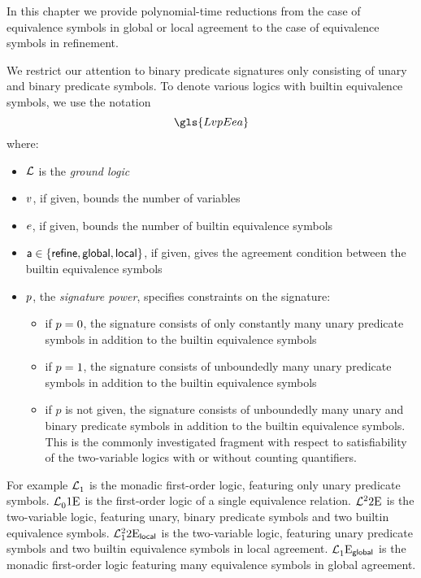 In this chapter we provide polynomial-time reductions from the case of
equivalence symbols in global or local agreement to the case of equivalence
symbols in refinement.

We restrict our attention to binary predicate signatures only consisting of
unary and binary predicate symbols.
To denote various logics with builtin equivalence symbols, we use the notation
\[
  \gls{LvpEea}
\]
where:
\begin{itemize}
  \item $\mathcal{L}$ is the \emph{ground logic}
  \item $v$, if given, bounds the number of variables
  \item $e$, if given, bounds the number of builtin equivalence symbols
  \item $\mathsf{a} \in \left\{\mathsf{refine}, \mathsf{global}, \mathsf{local}\right\}$, if given, gives the
  agreement condition between the builtin equivalence symbols
  \item $p$, the \emph{signature power}, specifies constraints on the
  signature:
  \begin{itemize}
    \item if $p = 0$, the signature consists of only constantly many unary
    predicate symbols in addition to the builtin equivalence symbols
    \item if $p = 1$, the signature consists of unboundedly many unary
    predicate symbols in addition to the builtin equivalence symbols
    \item if $p$ is not given, the signature consists of unboundedly many unary
    and binary predicate symbols in addition to the builtin equivalence symbols.
    This is the commonly investigated fragment with respect to satisfiability of
    the two-variable logics with or without counting quantifiers.
  \end{itemize}
\end{itemize}

For example $\mathcal{L}^{{}}_{1}$ is the monadic first-order logic, featuring only
unary predicate symbols.
$\mathcal{L}^{{}}_{0}{1}\mathrm{E}_{{}}$ is the first-order logic of a single equivalence
relation.
$\mathcal{L}^{2}_{{}}{2}\mathrm{E}_{{}}$ is the two-variable logic, featuring unary, binary
predicate symbols and two builtin equivalence symbols.
$\mathcal{L}^{2}_{1}{2}\mathrm{E}_{\mathsf{local}}$ is the two-variable logic,
featuring unary predicate symbols and two builtin equivalence symbols in local
agreement.
$\mathcal{L}^{{}}_{1}{{}}\mathrm{E}_{\mathsf{global}}$ is the monadic first-order logic featuring
many equivalence symbols in global agreement.

